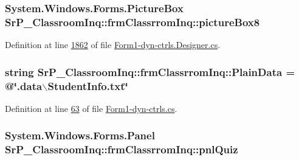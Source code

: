 \hypertarget{class_sr_p___classroom_inq_1_1frm_classrrom_inq_a22ca58dbc8343b3531e756221803eb3d}{
\subsubsection[{picture\-Box8}]{\setlength{\rightskip}{0pt plus 5cm}\-System.\-Windows.\-Forms.\-Picture\-Box {\bf \-Sr\-P\-\_\-\-Classroom\-Inq\-::frm\-Classrrom\-Inq\-::picture\-Box8}}}
\label{class_sr_p___classroom_inq_1_1frm_classrrom_inq_a22ca58dbc8343b3531e756221803eb3d}


\-Definition at line \hyperlink{_form1-dyn-ctrls_8_designer_8cs_source_l01862}{1862} of file \hyperlink{_form1-dyn-ctrls_8_designer_8cs_source}{\-Form1-\/dyn-\/ctrls.\-Designer.\-cs}.

\hypertarget{class_sr_p___classroom_inq_1_1frm_classrrom_inq_a511d08cf3bdc5282be448f0513bbd262}{
\subsubsection[{\-Plain\-Data}]{\setlength{\rightskip}{0pt plus 5cm}string {\bf \-Sr\-P\-\_\-\-Classroom\-Inq\-::frm\-Classrrom\-Inq\-::\-Plain\-Data} = @\char`\"{}.data$\backslash$\-Student\-Info.\-txt\char`\"{}}}
\label{class_sr_p___classroom_inq_1_1frm_classrrom_inq_a511d08cf3bdc5282be448f0513bbd262}


\-Definition at line \hyperlink{_form1-dyn-ctrls_8cs_source_l00063}{63} of file \hyperlink{_form1-dyn-ctrls_8cs_source}{\-Form1-\/dyn-\/ctrls.\-cs}.

\hypertarget{class_sr_p___classroom_inq_1_1frm_classrrom_inq_a482ea3246ef232cad6430e85e54a0e3a}{
\subsubsection[{pnl\-Quiz}]{\setlength{\rightskip}{0pt plus 5cm}\-System.\-Windows.\-Forms.\-Panel {\bf \-Sr\-P\-\_\-\-Classroom\-Inq\-::frm\-Classrrom\-Inq\-::pnl\-Quiz}}}
\label{class_sr_p___classroom_inq_1_1frm_classrrom_inq_a482ea3246ef232cad6430e85e54a0e3a}



